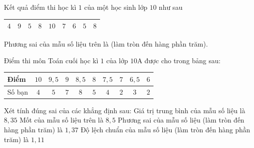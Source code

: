 \begin{bt}%
Kết quả điểm thi học kì $1$ của một học sinh lớp $10$ như sau
\begin{center}\begin{tabular}{|l|l|l|l|l|l|l|l|l|}
	\hline $4$ & $9$ &$5$ & $8$ & $10$ & $7$ & $6$ & $5$ & $8$ \\
	\hline
\end{tabular}\end{center}
Phương sai của mẫu số liệu trên là (làm tròn đến hàng phần trăm).
\end{bt}

\begin{ex}%
	Điểm thi môn Toán cuối học kì $1$ của lớp $10\text{A}$ được cho trong bảng sau:
	\begin{center}
		\begin{tabular}{|l|c|c|c|c|c|c|c|c|c|}
			\hline
			Điểm & $10$ & $9{,}5$ & $9$ & $8{,}5$ & $8$ & $7{,}5$ & $7$ & $6{,}5$ & $6$ \\
			\hline
			Số bạn & $4$ & $5$ & $7$ & $8$ & $5$ & $4$ & $2$ & $3$ & $2$ \\
			\hline
		\end{tabular}
	\end{center}
	Xét tính đúng sai của các khẳng định sau:
	\choiceTF
		{\True Giá trị trung bình của mẫu số liệu là $8{,}35$}
		{\True Mốt của mẫu số liệu trên là $8{,}5$}
		{Phương sai của mẫu số liệu (làm tròn đến hàng phần trăm) là $1{,}37$}
		{\True Độ lệch chuẩn của mẫu số liệu (làm tròn đến hàng phần trăm) là $1{,}11$}
\end{ex}
